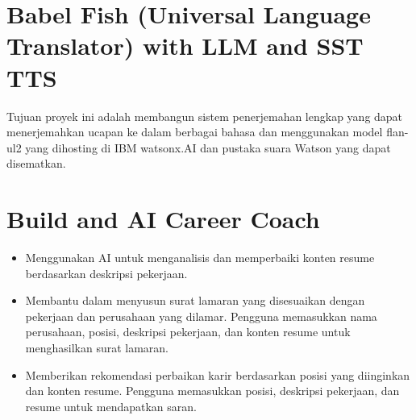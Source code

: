 \documentclass{article}
\begin{document}
\newpage

\section{Babel Fish (Universal Language Translator) with LLM and SST TTS}
Tujuan proyek ini adalah membangun sistem penerjemahan lengkap yang dapat menerjemahkan ucapan ke dalam berbagai bahasa dan menggunakan model flan-ul2 yang dihosting di IBM watsonx.AI dan pustaka suara Watson yang dapat disematkan.

\newpage

\section{Build and AI Career Coach}
\begin{itemize}
    \item Menggunakan AI untuk menganalisis dan memperbaiki konten resume berdasarkan deskripsi pekerjaan.
    \item Membantu dalam menyusun surat lamaran yang disesuaikan dengan pekerjaan dan perusahaan yang dilamar. Pengguna memasukkan nama perusahaan, posisi, deskripsi pekerjaan, dan konten resume untuk menghasilkan surat lamaran.
    \item Memberikan rekomendasi perbaikan karir berdasarkan posisi yang diinginkan dan konten resume. Pengguna memasukkan posisi, deskripsi pekerjaan, dan resume untuk mendapatkan saran.
\end{itemize}
\newpage
\end{document}
